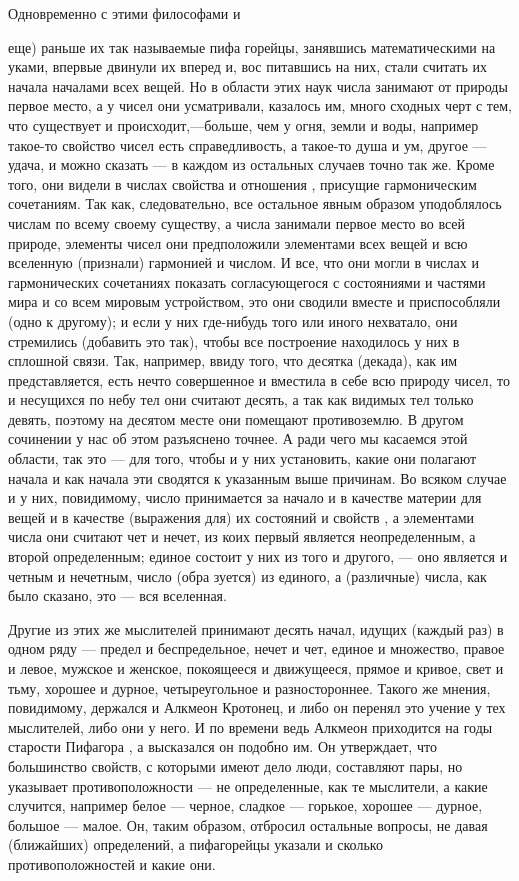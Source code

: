 \documentclass{article}
\begin{document}
Одновременно с этими философами и {еще) раньше их так называемые пифа горейцы, занявшись математическими на уками, впервые двинули их вперед и, вос питавшись на них, стали считать их начала началами всех вещей. Но в области этих наук числа занимают от природы первое место, а у чисел они усматривали, казалось им, много сходных черт с тем, что существует и происходит,—больше, чем у огня, земли и воды, например такое-то свойство чисел есть справедливость, а такое-то душа и ум, другое — удача, и можно сказать — в каждом из остальных случаев точно так же. Кроме того, они видели в числах свойства и отношения , присущие гармоническим сочетаниям. Так как, следовательно, все остальное явным образом уподоблялось числам по всему своему существу, а числа занимали первое место во всей природе, элементы чисел они предположили элементами всех вещей и всю вселенную (признали) гармонией и числом. И все, что они могли в числах и гармонических сочетаниях показать согласующегося с состояниями и частями мира и со всем мировым устройством, это они сводили вместе и приспособляли (одно к другому); и если у них где-нибудь того или иного нехватало, они стремились (добавить это так), чтобы все построение находилось у них в сплошной связи. Так, например, ввиду того, что десятка (декада), как им представляется, есть нечто совершенное и вместила в себе всю природу чисел, то и несущихся по небу тел они считают десять, а так как видимых тел только девять, поэтому на десятом месте они помещают противоземлю.
\footnotemark[1]
В другом сочинении у нас об этом разъяснено точнее.
\footnotemark[2]
А ради чего мы касаемся этой области, так это — для того, чтобы и у них установить, какие они полагают начала и как начала эти сводятся к указанным выше причинам. Во всяком случае и у них, повидимому, число принимается за начало и в качестве материи для вещей и в качестве (выражения для) их состояний и свойств , а элементами числа они считают чет и нечет, из коих первый является неопределенным, а второй определенным; единое состоит у них из того и другого, — оно является и четным и нечетным, число (обра зуется) из единого, а (различные) числа, как было сказано, это — вся вселенная.

Другие из этих же мыслителей принимают десять начал, идущих (каждый раз) в одном ряду — предел и беспредельное, нечет и чет, единое и множество, правое и левое, мужское и женское, покоящееся и движущееся, прямое и кривое, свет и тьму, хорошее и дурное, четыреугольное и разностороннее.
\footnotemark[3]
Такого же мнения, повидимому, держался и Алкмеон Кротонец,
\footnotemark[4]
и либо он перенял это учение у тех мыслителей, либо они у него. И по времени ведь Алкмеон приходится на годы старости Пифагора , а высказался он подобно им. Он утверждает, что большинство свойств, с которыми имеют дело люди, составляют пары, но указывает противоположности — не определенные, как те мыслители, а какие случится, например белое — черное, сладкое — горькое, хорошее — дурное, большое — малое. Он, таким образом, отбросил остальные вопросы, не давая (ближайших) определений, а пифагорейцы указали и сколько противоположностей и какие они.

}
\end{document}
